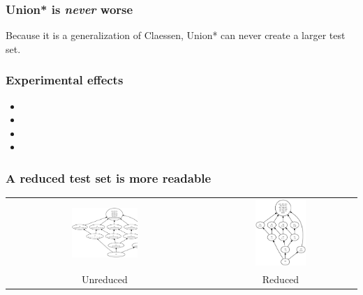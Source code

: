 \documentclass[svgnames,14pt]{beamer}
\theoremstyle{definition}
\begin{document}
\begin{frame}
\frametitle{Union* is \emph{never} worse}
Because it is a generalization of Claessen, Union* can never create a larger test set.
\end{frame}

\begin{frame}
\frametitle{Experimental effects}
\begin{itemize}
\item {}
\item {}
\item {}
\item {}
\end{itemize}
\end{frame}

\begin{frame}
\frametitle{A reduced test set is more readable}
\begin{center} 
\begin{tabular}{cc}
\includegraphics[width=0.35\textwidth, height=0.65\textheight]{fail.ps}
&
\includegraphics[width=0.35\textwidth]{success.ps}\\
Unreduced &
Reduced \\
\end{tabular}
\end{center}

\end{frame}
\end{document}
